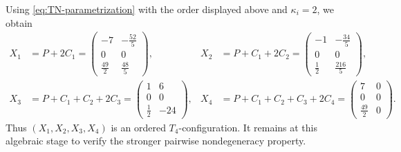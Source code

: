 \documentclass[11pt,reqno]{amsart}
\theoremstyle{definition}
\begin{document}
Using \cref{eq:TN-parametrization} with the order displayed above and
$\kappa_i=2$, we obtain
\begin{align}
  X_1&=P+2C_1
  =
  \begin{pmatrix}
    -7&-\frac{52}{5}\\
    0&0\\
    \frac{49}{2}&\frac{48}{5}
  \end{pmatrix},
  &
  X_2&=P+C_1+2C_2
  =
  \begin{pmatrix}
    -1&-\frac{34}{5}\\
    0&0\\
    \frac12&\frac{216}{5}
  \end{pmatrix},
  \label{eq:X12}\\[1ex]
  X_3&=P+C_1+C_2+2C_3
  =
  \begin{pmatrix}
    1&6\\
    0&0\\
    \frac12&-24
  \end{pmatrix},
  &
  X_4&=P+C_1+C_2+C_3+2C_4
  =
  \begin{pmatrix}
    7&0\\
    0&0\\
    \frac{49}{2}&0
  \end{pmatrix}.
  \label{eq:X34}
\end{align}
Thus $(X_1,X_2,X_3,X_4)$ is an ordered $T_4$-configuration.  It remains at
this algebraic stage to verify the stronger pairwise nondegeneracy property.
\end{document}
